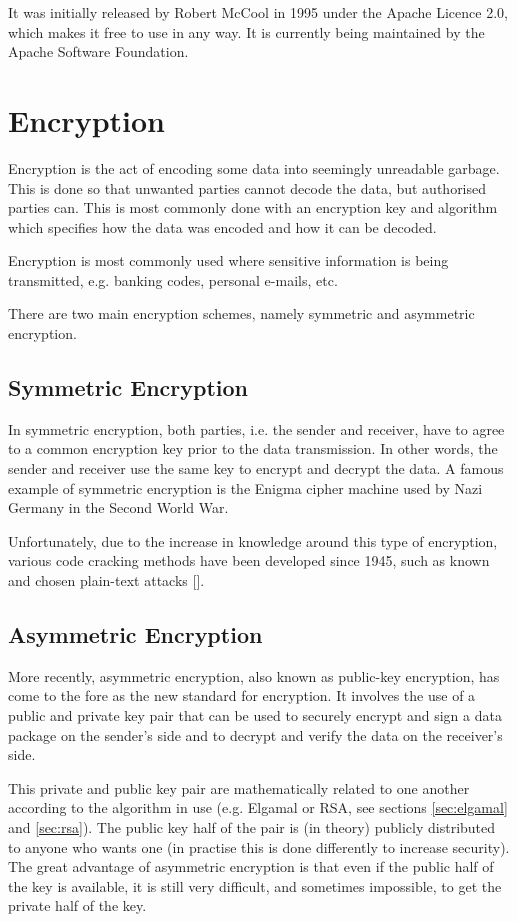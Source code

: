 It was initially released by Robert McCool in 1995 under the Apache Licence 2.0, which makes it
free to use in any way. It is currently being maintained by the Apache Software Foundation. 

\section{Encryption}

Encryption is the act of encoding some data into seemingly unreadable garbage. This is done so
that unwanted parties cannot decode the data, but authorised parties can. This is most commonly
done with an encryption key and algorithm which specifies how the data was encoded and how it
can be decoded.

Encryption is most commonly used where sensitive information is being transmitted, e.g. banking
codes, personal e-mails, etc.

There are two main encryption schemes, namely symmetric and asymmetric encryption. 

\subsection{Symmetric Encryption}

In symmetric encryption, both parties, i.e. the sender and receiver, have to agree to a common
encryption key prior to the data transmission. In other words, the sender and receiver use the
same key to encrypt and decrypt the data. A famous example of symmetric encryption is the
Enigma cipher machine used by Nazi Germany in the Second World War. 

Unfortunately, due to the increase in knowledge around this type of encryption, various code
cracking methods have been developed since 1945, such as known and chosen plain-text attacks
[\cite{website:cipher-attacks}].

\subsection{Asymmetric Encryption}

More recently, asymmetric encryption, also known as public-key encryption, has come to the fore
as the new standard for encryption. It involves the use of a public and private key pair that
can be used to securely encrypt and sign a data package on the sender's side and to decrypt
and verify the data on the receiver's side.

This private and public key pair are mathematically related to one another according to the
algorithm in use (e.g. Elgamal or RSA, see sections \ref{sec:elgamal} and \ref{sec:rsa}). The
public key half of the pair is (in theory) publicly distributed to anyone who wants one (in
practise this is done differently to increase security). The great advantage of asymmetric
encryption is that even if the public half of the key is available, it is still very difficult,
and sometimes impossible, to get the private half of the key.

